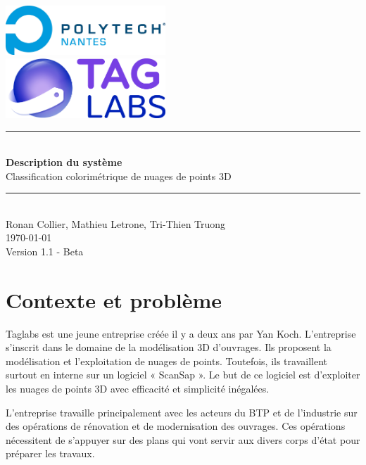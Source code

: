 \documentclass[12pt,titlepage,french]{article}
\begin{document}
\begin{titlepage}
\newcommand{\HRule}{\rule{\linewidth}{0.5mm}}
\center

  \includegraphics[width=0.45\textwidth]{../ressources/img_logos/logo_polytech.png}\\[1cm]

  \includegraphics[width=0.45\textwidth]{../ressources/img_logos/logo_taglabs.png}


\HRule \\[0.4cm]
{ \huge \bfseries Description du système \\[0.15cm] }
Classification colorimétrique de nuages de points 3D
\HRule \\[1.5cm]
Ronan Collier,
Mathieu Letrone,
Tri-Thien Truong
\\[1cm]
\today \\ [1cm]
Version 1.1 - Beta
\end{titlepage}

\tableofcontents %
\newpage
\listoffigures  %
\newpage
\section{Contexte et problème}

Taglabs est une jeune entreprise créée il y a deux ans par Yan Koch. L’entreprise s’inscrit dans le domaine de la modélisation 3D d’ouvrages. Ils proposent la modélisation et l’exploitation de nuages de points. Toutefois, ils travaillent surtout en interne sur un logiciel « ScanSap ». Le but de ce logiciel est d’exploiter les nuages de points 3D avec efficacité et simplicité inégalées. \newline

L’entreprise travaille principalement avec les acteurs du BTP et de l’industrie sur des opérations de rénovation et de modernisation des ouvrages. Ces opérations nécessitent de s’appuyer sur des plans qui vont servir aux divers corps d’état pour préparer les travaux.\newline
\end{document}
